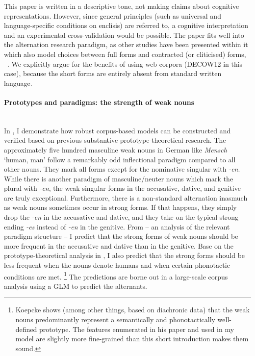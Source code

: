 This paper is written in a descriptive tone, not making claims about cognitive representations.
However, since general principles (such as universal and language-specific conditions on enclisis) are referred to, a cognitive interpretation and an experimental cross-validation would be possible.
The paper fits well into the alternation research paradigm, as other studies have been presented within it which also model choices between full forms and contracted (or cliticised) forms, \eeg\ \citet{BarthKapatsinski2014}.
We explicitly argue for the benefits of using web corpora (DECOW12 in this case), because the short forms are entirely absent from standard written language.

\paragraph[Prototypes and paradigms]{Prototypes and paradigms: the strength of weak nouns}
\mbox{}\\[0.5\baselineskip]\noindent
In \ROWeakN, I demonstrate how robust corpus-based models can be constructed and verified based on previous substantive prototype-theoretical research.
The approximately five hundred masculine weak nouns in German like \textit{Mensch} `human, man' follow a remarkably odd inflectional paradigm compared to all other nouns.
They mark all forms except for the nominative singular with \textit{-en}.
While there is another paradigm of masculine\slash neuter nouns which mark the plural with \textit{-en}, the weak singular forms in the accusative, dative, and genitive are truly exceptional.
Furthermore, there is a non-standard alternation inasmuch as weak nouns sometimes occur in strong forms.
If that happens, they simply drop the \textit{-en} in the accusative and dative, and they take on the typical strong ending \textit{-es} instead of \textit{-en} in the genitive.
From \citet{Thieroff2003} -- an analysis of the relevant paradigm structure -- I predict that the strong forms of weak nouns should be more frequent in the accusative and dative than in the genitive.
Base on the prototype-theoretical analysis in \citet{Koepcke1995}, I also predict that the strong forms should be less frequent when the nouns denote humans and when certain phonotactic conditions are met.%
\footnote{Koepcke shows (among other things, based on diachronic data) that the weak nouns predominantly represent a semantically and phonotactically well-defined prototype.
The features enumerated in his paper and used in my model are slightly more fine-grained than this short introduction makes them sound.}
The predictions are borne out in a large-scale corpus analysis using a GLM to predict the alternants.

